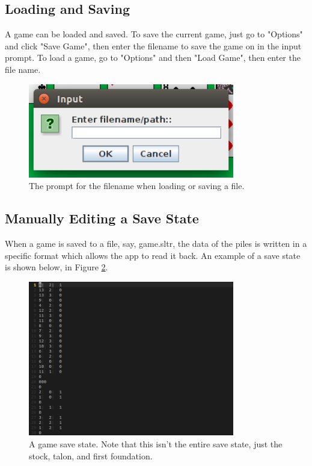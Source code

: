 \documentclass[12pt,a4paper,titlepage]{article}
\begin{document}
	\subsection{Loading and Saving}
	A game can be loaded and saved. To save the current game, just go to
	"Options" and click "Save Game", then enter the filename to save the game on
	in the input prompt. To load a game, go to "Options" and then "Load Game",
	then enter the file name.

	\begin{figure}[H]
		\centering
		\captionsetup{justification=centering}
		\includegraphics[width=9cm]{images/fig5.png}
		\caption{The prompt for the filename when loading or saving a file.}
		\label{fig:fig5}
	\end{figure}

	\subsection{Manually Editing a Save State}
	When a game is saved to a file, say, game.sltr, the data of the piles is
	written in a specific format which allows the app to read it back. An
	example of a save state is shown below, in Figure \ref{fig:fig6}.

	\begin{figure}[H]
		\centering
		\captionsetup{justification=centering}
		\includegraphics[width=9cm]{images/fig6.png}
		\caption{A game save state. Note that this isn't the entire save state,
		just the stock, talon, and first foundation.}
		\label{fig:fig6}
	\end{figure}
\end{document}
